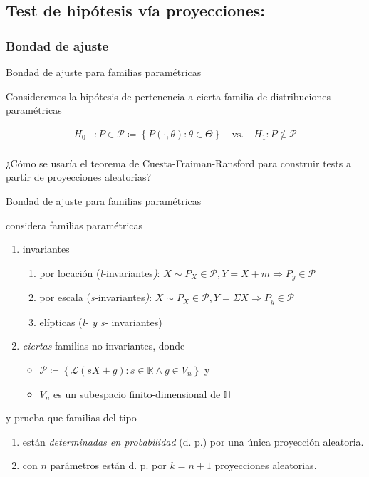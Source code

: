 \documentclass[10pt,spanish,handout]{beamer}\usepackage[]{graphicx}\usepackage[]{color}
\begin{document}
\subsection{Test de hipótesis vía proyecciones:}

\subsubsection{Bondad de ajuste}
\begin{frame}{Bondad de ajuste para familias paramétricas}

Consideremos la hipótesis de pertenencia a cierta familia de distribuciones
paramétricas

\begin{align*}
H_{0} & :P\in\mathcal{P}\coloneqq\left\{ P\left(\cdot,\theta\right):\theta\in\Theta\right\} \quad\text{vs.}\quad H_{1}:P\notin\mathcal{P}\\
\end{align*}


\pause{}

¿Cómo se usaría el teorema de Cuesta-Fraiman-Ransford para construir
tests a partir de proyecciones aleatorias?
\end{frame}
%
\begin{frame}{Bondad de ajuste para familias paramétricas}

\cite{Cuesta 2007} considera familias paramétricas
\begin{enumerate}[<+->]
\item invariantes
\begin{enumerate}[<+->]
\item por locación (\emph{l-}invariantes\emph{)}: $X\sim P_{X}\in\mathcal{P},Y=X+m\Rightarrow P_{y}\in\mathcal{P}$
\item por escala (\emph{s-}invariantes\emph{)}: $X\sim P_{X}\in\mathcal{P},Y=\Sigma X\Rightarrow P_{y}\in\mathcal{P}$
\item elípticas (\emph{l- y s- }invariantes)
\end{enumerate}
\item \emph{ciertas }familias no-invariantes, donde
\begin{itemize}
\item $\mathcal{P}\coloneqq\left\{ \mathcal{L}\left(sX+g\right):s\in\mathbb{R}\land g\in V_{n}\right\} $
y
\item $V_{n}$ es un subespacio finito-dimensional de $\mathbb{H}$
\end{itemize}
\end{enumerate}

\pause{}

y prueba que familias del tipo
\begin{enumerate}[<+->]
\item están \emph{determinadas en probabilidad} (d. p.) por una única proyección
aleatoria.
\item con $n$ parámetros están d. p. por $k=n+1$ proyecciones aleatorias.
\end{enumerate}
\end{frame}
\end{document}
